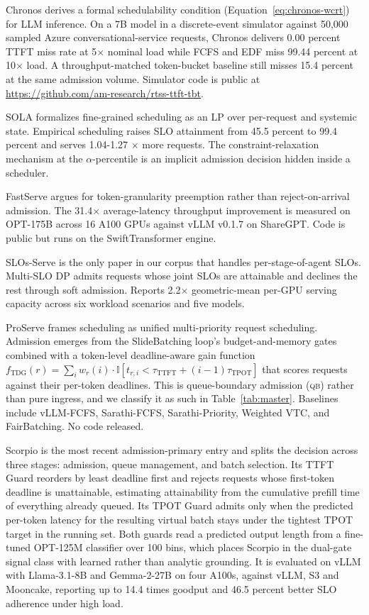\documentclass[11pt,letterpaper]{article}
\theoremstyle{definition}
\begin{document}
Chronos \cite{marref2026chronos} derives a formal schedulability
condition (Equation~\ref{eq:chronos-wcrt}) for LLM inference. On a 7B
model in a discrete-event simulator against 50{,}000 sampled Azure
conversational-service requests, Chronos delivers 0.00 percent TTFT
miss rate at 5$\times$ nominal load while FCFS and EDF miss 99.44
percent at 10$\times$ load. A throughput-matched token-bucket baseline
still misses 15.4 percent at the same admission volume. Simulator code
is public at \url{https://github.com/am-research/rtss-ttft-tbt}.

SOLA \cite{hong2025sola} formalizes fine-grained scheduling as an LP
over per-request and systemic state. Empirical scheduling raises SLO
attainment from 45.5 percent to 99.4 percent and serves 1.04-1.27
$\times$ more requests. The constraint-relaxation mechanism at the
$\alpha$-percentile is an implicit admission decision hidden inside a
scheduler.

FastServe \cite{wu2026fastserve} argues for token-granularity
preemption rather than reject-on-arrival admission. The 31.4$\times$
average-latency throughput improvement is measured on OPT-175B across
16 A100 GPUs against vLLM v0.1.7 on ShareGPT. Code is public but runs
on the SwiftTransformer engine.

SLOs-Serve \cite{chen2025slosserve} is the only paper in our corpus
that handles per-stage-of-agent SLOs. Multi-SLO DP admits requests
whose joint SLOs are attainable and declines the rest through soft
admission. Reports 2.2$\times$ geometric-mean per-GPU serving capacity
across six workload scenarios and five models.

ProServe \cite{huang2025proserve} frames scheduling as unified
multi-priority request scheduling. Admission emerges from the
SlideBatching loop's budget-and-memory gates combined with a
token-level deadline-aware gain function
$f_{\text{TDG}}(r) = \sum_i w_r(i) \cdot
\mathbb{I}[t_{r,i} < \tau_{\text{TTFT}} + (i-1)\tau_{\text{TPOT}}]$
that scores requests against their per-token deadlines. This is
queue-boundary admission (\textsc{qb}) rather than pure ingress, and
we classify it as such in Table~\ref{tab:master}. Baselines include
vLLM-FCFS, Sarathi-FCFS, Sarathi-Priority, Weighted VTC, and
FairBatching. No code released.

Scorpio \cite{he2026scorpio} is the most recent admission-primary entry
and splits the decision across three stages: admission, queue
management, and batch selection. Its TTFT Guard reorders by least
deadline first and rejects requests whose first-token deadline is
unattainable, estimating attainability from the cumulative prefill time
of everything already queued. Its TPOT Guard admits only when the
predicted per-token latency for the resulting virtual batch stays under
the tightest TPOT target in the running set. Both guards read a
predicted output length from a fine-tuned OPT-125M classifier over 100
bins, which places Scorpio in the dual-gate signal class with learned
rather than analytic grounding. It is evaluated on vLLM with
Llama-3.1-8B and Gemma-2-27B on four A100s, against vLLM, S3 and
Mooncake, reporting up to 14.4 times goodput and 46.5 percent better SLO
adherence under high load.
\end{document}
